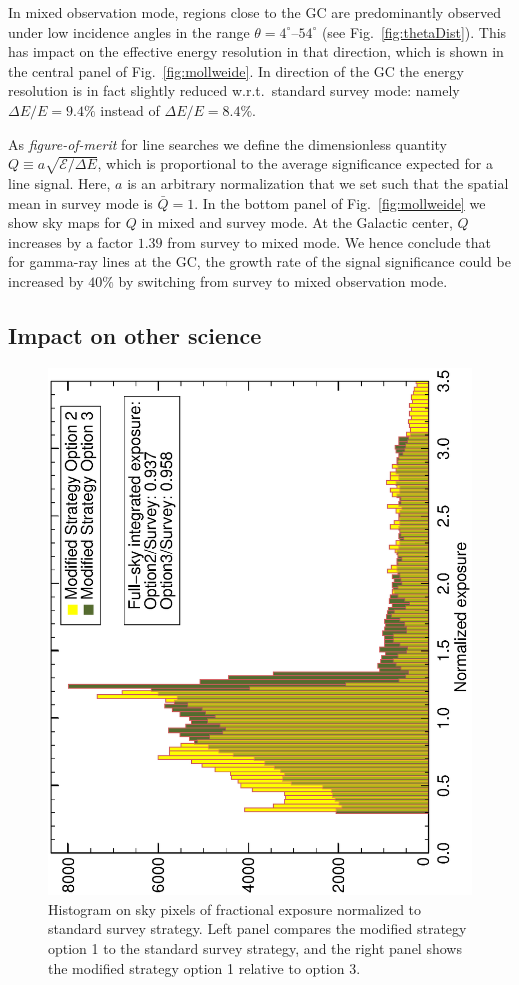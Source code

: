 \documentclass[aps,prd,superscriptaddress,showpacs,nofootinbib,fixlfloat, 12pt]{revtex4-1}
\begin{document}
In mixed observation mode, regions close to the GC are predominantly observed
under low incidence angles in the range $\theta=4^\circ$--$54^\circ$ (see
Fig.~\ref{fig:thetaDist}). This has impact on the effective energy resolution
in that direction, which is shown in the central panel of
Fig.~\ref{fig:mollweide}. In direction of the GC the energy resolution is in
fact slightly reduced w.r.t.~standard survey mode: namely $\Delta E/E=9.4\%$
instead of $\Delta E/E=8.4\%$.

As \emph{figure-of-merit} for line searches we define the dimensionless
quantity $Q\equiv a\sqrt{\mathcal{E}/\Delta E}$, which is proportional to the
average significance expected for a line signal. Here, $a$ is an arbitrary
normalization that we set such that the spatial mean in survey mode is $\bar
Q=1$. In the bottom panel of Fig.~\ref{fig:mollweide} we show sky maps for $Q$
in mixed and survey mode. At the Galactic center, $Q$ increases by a factor
$1.39$ from survey to mixed mode. We hence conclude that for gamma-ray lines
at the GC, the growth rate of the signal significance could be increased by
$40\%$ by switching from survey to mixed observation mode.

\subsection{Impact on other science}

\begin{figure}[t]
  \begin{center}
    \includegraphics[width=0.49\linewidth, angle=-90]{plots/option2_option3_hist.ps}
    \vspace{-0.5cm}
  \end{center}
  \caption{Histogram on sky pixels of fractional exposure normalized to
  standard survey strategy. Left panel compares the modified strategy option 1
  to the standard survey strategy, and the right panel shows the modified
  strategy option 1 relative to option 3. }
  \label{fig:expHisto}
\end{figure}
\end{document}
